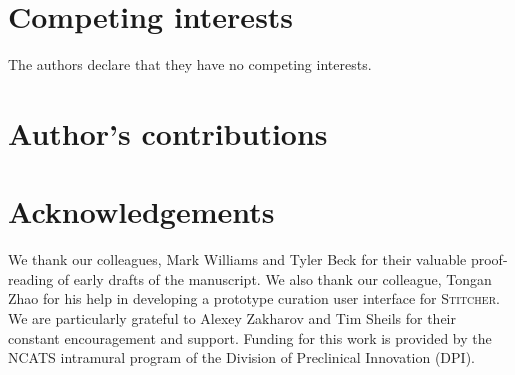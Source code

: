 \documentclass{bmcart}
\newcommand\st{\textsc{Stitcher}}
\begin{document}

\begin{backmatter}

\section*{Competing interests}
  The authors declare that they have no competing interests.

\section*{Author's contributions}


\section*{Acknowledgements}
We thank our colleagues, Mark Williams and Tyler Beck for their
valuable proof-reading of early drafts of the manuscript. We also
thank our colleague, Tongan Zhao for his help in developing a
prototype curation user interface for \st. We are particularly grateful
to Alexey Zakharov and Tim Sheils for their constant encouragement and
support. Funding for this work is provided by the NCATS intramural
program of the Division of Preclinical Innovation (DPI).




\end{backmatter}
\end{document}

